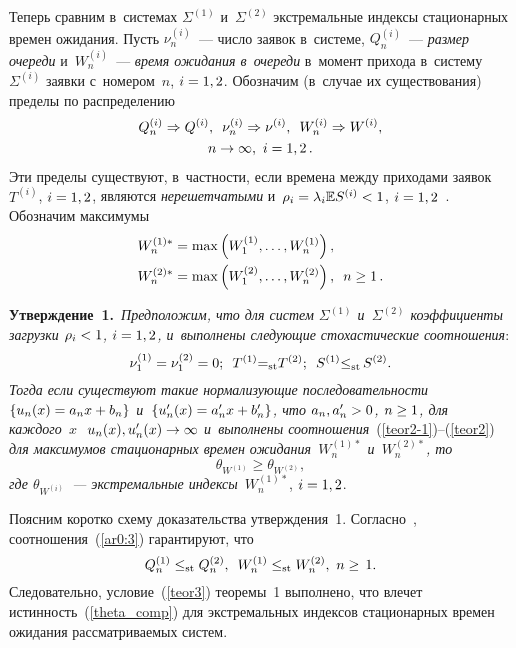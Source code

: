 \begin{multicols}{2}
  Теперь  сравним  в~системах  $\Sigma^{(1)}$ и~$\Sigma^{(2)}$ экстремальные 
индексы стационарных времен ожидания.
Пусть   $\nu_n^{(i)}$~--- чис\-ло заявок в~сис\-те\-ме,   $Q_n^{(i)}$~---  \textit{размер 
очереди} и~$W_n^{(i)}$~---   \textit{время ожидания в~очереди} в~момент прихода 
в~сис\-те\-му~$\Sigma^{(i)}$
заявки с~номером~$n$, $i\hm=1,2$.
Обозначим (в~случае их существования) пределы по распределению
\begin{multline*}
Q_n^{(i)} \Rightarrow Q^{(i)},\enskip \nu_n^{(i)} \Rightarrow \nu^{(i)}, \enskip 
W_n^{(i)} \Rightarrow W^{(i)} ,\\
 n\to \infty,\  i=1,2\,.
\end{multline*}
Эти  пределы существуют, в~част\-ности,  если времена между приходами заявок~$T^{(i)}$,
$i\hm=1,2$,  являются \textit{нерешетчатыми}  
и~$\rho_i\hm=\lambda_i \mathbb{E} S^{(i)} \hm<1$, $i\hm=1,2$~\cite{Asmus}.
Обозначим максимумы
\begin{align*}
W_n^{(1)*}&=\max\left(W_1^{(1)},\dots, W_n^{(1)}\right),\\
W_n^{(2)*}&=\max\left(W_1^{(2)},\dots, W_n^{(2)}\right),\enskip n\ge 1\,.
\end{align*}

\noindent
\textbf{Утверждение~1.}\
\textit{Предположим, что для сис\-тем $\Sigma^{(1)}$ и~$\Sigma^{(2)}$  
коэффициенты загрузки  $\rho_i\hm<1$, 
$i\hm=1,2$, и~выполнены  сле\-ду\-ющие стохастические соотношения}:
\begin{equation}
\label{ar0:3}
   \nu_1^{(1)}=\nu_1^{(2)}=0;\enskip  T^{(1)}{=_{\mathrm{st}}}
T^{(2)};\enskip S^{(1)}{\le}_{\mathrm{st}}\, S^{(2)}.
\end{equation}
\textit{Тогда если  существуют такие нормализующие последовательности $\{u_n(x)\hm=a_n x\hm+ 
b_n\}$ и~$\{u_n'(x)\hm=a_n'x\hm+b_n'\}$, что $a_n, a_n'\hm >0$, $n\hm\ge 1$, для каждого~$x$ 
$\ u_n(x), u_n'(x) \hm\to \infty$ и~выполнены соотношения}~(\ref{teor2-1})--(\ref{teor2}) 
\textit{для  максимумов стационарных времен ожидания~$W_n^{(1)*}$ и~$W_n^{(2)*}$, то}
\begin{equation}
\label{extr-wait}
  \theta_{W^{(1)}}\ge   \theta_{W^{(2)}},
\end{equation}
\textit{где $\theta_{W^{(i)}}$~--- экстремальные индексы}~$W_n^{(1)*}$,  $i\hm=1,2$.

\smallskip


Поясним коротко схему доказательства утверж\-де\-ния~1. Согласно~\cite{Whitt}, 
соотношения~(\ref{ar0:3}) гарантируют, что
\begin{equation*}
 Q_n^{(1)} \le_{\mathrm{st}} Q_n^{(2)},\enskip  W_n^{(1)} \le_{\mathrm{st}} W_n^{(2)},\  n\ge \,1.
\end{equation*}
Следовательно, условие~(\ref{teor3}) тео\-ре\-мы~1  выполнено, 
что влечет истинность~(\ref{theta_comp}) 
для экстремальных индексов стационарных времен ожидания 
рас\-смат\-ри\-ва\-емых сис\-тем.


\end{multicols}
